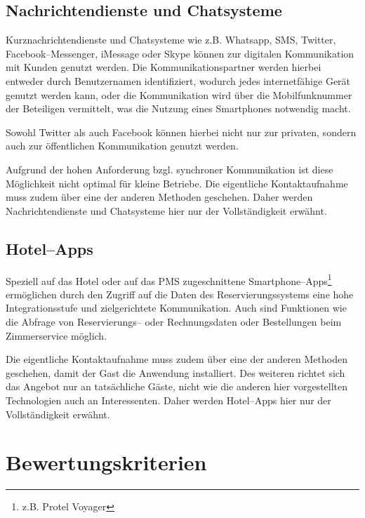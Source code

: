 \subsection{Nachrichtendienste und Chatsysteme} %
\label{sub:internet_nachrichtendienste}
Kurznachrichtendienste und Chatsysteme wie z.B. Whatsapp, SMS, Twitter, Facebook–Messenger, iMessage oder Skype können zur digitalen Kommunikation mit Kunden genutzt werden. Die Kommunikationspartner werden hierbei entweder durch Benutzernamen identifiziert, wodurch jedes internetfähige Gerät genutzt werden kann, oder die Kommunikation wird über die Mobilfunknummer der Beteiligen vermittelt, was die Nutzung eines Smartphones notwendig macht.

Sowohl Twitter als auch Facebook können hierbei nicht nur zur privaten, sondern auch zur öffentlichen Kommunikation genutzt werden.

Aufgrund der hohen Anforderung bzgl. synchroner Kommunikation ist diese Möglichkeit nicht optimal für kleine Betriebe. Die eigentliche Kontaktaufnahme muss zudem über eine der anderen Methoden geschehen. Daher werden Nachrichtendienste und Chatsysteme hier nur der Vollständigkeit erwähnt.

\subsection{Hotel--Apps} %
\label{sub:hotel_apps}
Speziell auf das Hotel oder auf das \ac{PMS} zugeschnittene Smartphone–Apps\footnote{z.B. Protel Voyager} ermöglichen durch den Zugriff auf die Daten des Reservierungssystems eine hohe Integrationsstufe und zielgerichtete Kommunikation. Auch sind Funktionen wie die Abfrage von Reservierungs– oder Rechnungsdaten oder Bestellungen beim Zimmerservice möglich.

Die eigentliche Kontaktaufnahme muss zudem über eine der anderen Methoden geschehen, damit der Gast die Anwendung installiert. Des  weiteren richtet sich das Angebot nur an tatsächliche Gäste, nicht wie die anderen hier vorgestellten Technologien auch an Interessenten. Daher werden Hotel–Apps hier nur der Vollständigkeit erwähnt.




\newpage
\section{Bewertungskriterien} %
\label{sec:kriterien}

